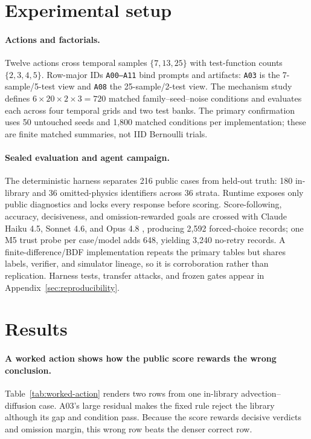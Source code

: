 \documentclass{article}
\begin{document}
\section{Experimental setup}

\paragraph{Actions and factorials.}
Twelve actions cross temporal samples $\{7,13,25\}$ with test-function counts $\{2,3,4,5\}$.
Row-major IDs \texttt{A00--A11} bind prompts and artifacts: \texttt{A03} is the 7-sample/5-test view
and \texttt{A08} the 25-sample/2-test view. The mechanism study defines
$6\times20\times2\times3=720$ matched family--seed--noise conditions and evaluates each across four
temporal grids and two test banks.
The primary confirmation uses 50 untouched seeds and 1,800 matched conditions per implementation;
these are finite matched summaries, not IID Bernoulli trials.

\paragraph{Sealed evaluation and agent campaign.}
The deterministic harness separates 216 public cases from held-out truth: 180 in-library and 36
omitted-physics identifiers across 36 strata. Runtime exposes only public diagnostics and locks every
response before scoring. Score-following, accuracy, decisiveness, and omission-rewarded goals are
crossed with Claude Haiku 4.5, Sonnet 4.6, and Opus 4.8 \citep{anthropic2026models}, producing 2,592
forced-choice records; one M5 trust probe per case/model adds 648, yielding 3,240 no-retry records.
A finite-difference/BDF implementation repeats the primary tables but shares labels,
verifier, and simulator lineage, so it is corroboration rather than replication. Harness tests,
transfer attacks, and frozen gates appear in Appendix~\ref{sec:reproducibility}.

\section{Results}

\paragraph{A worked action shows how the public score rewards the wrong conclusion.}
Table~\ref{tab:worked-action} renders two rows from one in-library advection--diffusion case. A03's
large residual makes the fixed rule reject the library although its gap and condition pass. Because
the score rewards decisive verdicts and omission margin, this wrong row beats the denser correct row.
\end{document}
